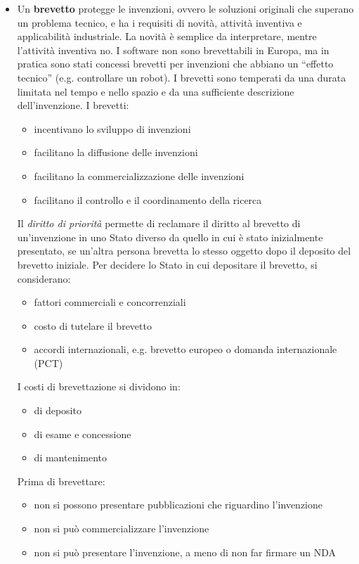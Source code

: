 \documentclass[answers, a4paper, 11pt]{exam}
\begin{document}
\begin{itemize}
    \item Un \textbf{brevetto} protegge le invenzioni, ovvero le soluzioni originali che superano un problema tecnico, e ha i requisiti di novità, attività inventiva e applicabilità industriale. La novità è semplice da interpretare, mentre l'attività inventiva no. I software non sono brevettabili in Europa, ma in pratica sono stati concessi brevetti per invenzioni che abbiano un ``effetto tecnico'' (e.g. controllare un robot). I brevetti sono temperati da una durata limitata nel tempo e nello spazio e da una sufficiente descrizione dell'invenzione. 
    I brevetti:
    \begin{itemize}
        \item incentivano lo sviluppo di invenzioni
        \item facilitano la diffusione delle invenzioni
        \item facilitano la commercializzazione delle invenzioni
        \item facilitano il controllo e il coordinamento della ricerca
    \end{itemize}
    Il \emph{diritto di priorità} permette di reclamare il diritto al brevetto di un'invenzione in uno Stato diverso da quello in cui è stato inizialmente presentato, se un'altra persona brevetta lo stesso oggetto dopo il deposito del brevetto iniziale. Per decidere lo Stato in cui depositare il brevetto, si considerano:
    \begin{itemize}
        \item fattori commerciali e concorrenziali
        \item costo di tutelare il brevetto
        \item accordi internazionali, e.g. brevetto europeo o domanda internazionale (PCT)
    \end{itemize}
    I costi di brevettazione si dividono in:
    \begin{itemize}
        \item di deposito
        \item di esame e concessione
        \item di mantenimento
    \end{itemize}
    Prima di brevettare:
    \begin{itemize}
        \item non si possono presentare pubblicazioni che riguardino l'invenzione
        \item non si può commercializzare l'invenzione
        \item non si può presentare l'invenzione, a meno di non far firmare un NDA
    \end{itemize}
    

\end{itemize}
\end{document}
